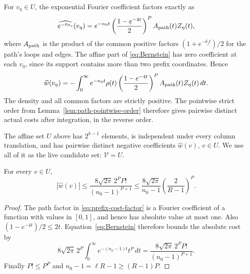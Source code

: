 For $v_\eta\in U$, the exponential Fourier coefficient factors exactly as
\begin{equation}\label{eq:prefix-cost-factor}
 \widehat{e^{-tn_s}}(v_\eta)
 =e^{-n_0t}\left(\frac{1-e^{-4t}}2\right)^P
    A_{\rm path}(t)Z_\eta(t),
\end{equation}
where $A_{\rm path}$ is the product of the common positive factors
$(1+e^{-\delta_jt})/2$ for the path's loops and edges. The affine part
of \eqref{eq:Bernstein} has zero coefficient at each $v_\eta$, since
its support contains more than two prefix coordinates. Hence
\[
 \widehat w(v_\eta)
 =-\int_0^\infty e^{-n_0t}\rho(t)
       \left(\frac{1-e^{-4t}}2\right)^P
       A_{\rm path}(t)Z_\eta(t)\,dt.
\]
The density and all common factors are strictly positive. The pointwise
strict order from Lemma~\ref{lem:path-pointwise-order} therefore gives
pairwise distinct actual costs after integration, in the reverse order.

\begin{lemma}
\label{lem:live-set}
The affine set $U$ above has $2^{k-1}$ elements, is independent under
every column translation, and has pairwise distinct negative
coefficients $\widehat w(v)$, $v\in U$. We use all of it as the live
candidate set: $\mathcal V=U$.
\end{lemma}

\begin{lemma}\label{lem:Walsh}
For every $v\in U$,
\begin{equation}\label{eq:Walsh-tail}
 |\widehat w(v)|\le
 \frac{8\sqrt{2\pi}\,2^P P!}{(n_0-1)^{P+1}}
 \le\frac{8\sqrt{2\pi}}{n_0-1}
         \left(\frac{2}{R-1}\right)^P.
\end{equation}
\end{lemma}
\begin{proof}
The path factor in \eqref{eq:prefix-cost-factor} is a Fourier
coefficient of a function with values in $[0,1]$, and hence has
absolute value at most one. Also
$(1-e^{-4t})/2\le2t$. Equation~\eqref{eq:Bernstein} therefore bounds
the absolute cost by
\[
 8\sqrt{2\pi}\,2^P\int_0^\infty e^{-(n_0-1)t}t^P\,dt
 =\frac{8\sqrt{2\pi}\,2^P P!}{(n_0-1)^{P+1}}.
\]
Finally $P!\le P^P$ and
$n_0-1=\ell R-1\ge (R-1)P$.
\end{proof}
